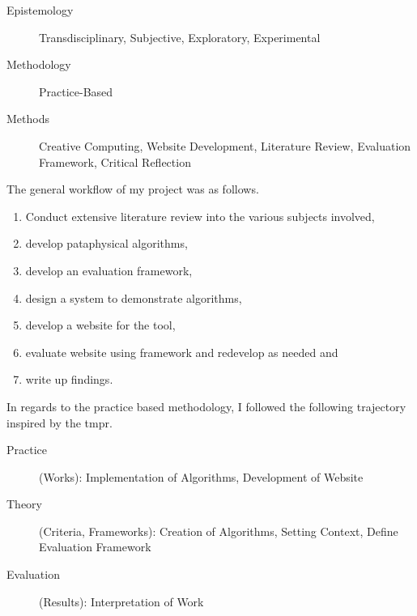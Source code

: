 \begin{description}
  \item [Epistemology] Transdisciplinary, Subjective, Exploratory, Experimental
  \item [Methodology] Practice-Based
  \item [Methods] Creative Computing, Website Development, Literature Review, Evaluation Framework, Critical Reflection
\end{description}

The general workflow of my project was as follows.

\begin{enumerate}
  \item Conduct extensive literature review into the various subjects involved,
  \item develop pataphysical algorithms,
  \item develop an evaluation framework,
  \item design a system to demonstrate algorithms,
  \item develop a website for the tool,
  \item evaluate website using framework and redevelop as needed and
  \item write up findings.
\end{enumerate}

In regards to the practice based methodology, I followed the following trajectory inspired by the \gls{tmpr}.


\begin{description}
  \item [Practice] (Works): Implementation of Algorithms, Development of Website
  \item [Theory] (Criteria, Frameworks): Creation of Algorithms, Setting Context, Define Evaluation Framework
  \item [Evaluation] (Results): Interpretation of Work
\end{description}

\stopcontents[chapters]
